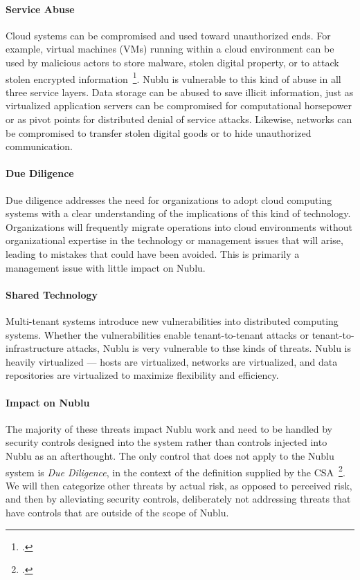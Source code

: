 \documentclass[10pt,letterpaper]{article}
\begin{document}
\paragraph{Service Abuse} Cloud systems can be compromised and used toward unauthorized ends.  For example, virtual machines (VMs) running within a cloud environment can be used by malicious actors to store malware, stolen digital property, or to attack stolen encrypted information~\footcite{ZhJuReRi:12}.  Nublu is vulnerable to this kind of abuse in all three service layers.  Data storage can be abused to save illicit information, just as virtualized application servers can be compromised for computational horsepower or as pivot points for distributed denial of service attacks.  Likewise, networks can be compromised to transfer stolen digital goods or to hide unauthorized communication.

\paragraph{Due Diligence} Due diligence addresses the need for organizations to adopt cloud computing systems with a clear understanding of the implications of this kind of technology.  Organizations will frequently migrate operations into cloud environments without organizational expertise in the technology or management issues that will arise, leading to mistakes that could have been avoided.  This is primarily a management issue with little impact on Nublu.

\paragraph{Shared Technology} Multi-tenant systems introduce new vulnerabilities into distributed computing systems.  Whether the vulnerabilities enable tenant-to-tenant attacks or tenant-to-infrastructure attacks, Nublu is very vulnerable to thse kinds of threats.  Nublu is heavily virtualized --- hosts are virtualized, networks are virtualized, and data repositories are virtualized to maximize flexibility and efficiency.

\paragraph{Impact on Nublu}
The majority of these threats impact Nublu work and need to be handled by security controls designed into the system rather than controls injected into Nublu as an afterthought.  The only control that does not apply to the Nublu system is {\sl Due Diligence}, in the context of the definition supplied by the CSA~\footcite{csa-noni:13}.  We will then categorize other threats by actual risk, as opposed to perceived risk, and then by alleviating security controls, deliberately not addressing threats that have controls that are outside of the scope of Nublu.
\end{document}
